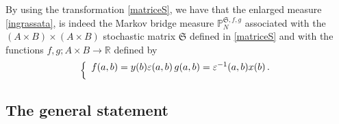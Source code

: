 \documentclass[reqno]{amsart}
\theoremstyle{plain}
\theoremstyle{definition}
\theoremstyle{remark}
\numberwithin{equation}{section}
\numberwithin{theorem}{section}
\def\\{\par\medskip}
\newcommand{\<}{\langle}
\renewcommand{\>}{\rangle}
\begin{document}
	By using the transformation \eqref{matriceS}, we have that the enlarged measure \eqref{ingrassata}, is indeed the Markov bridge measure $\mathbb P_N^{\mathfrak S,f,g}$ associated with the $(A\times B)\times (A\times B)$ stochastic matrix $\mathfrak S$ defined in \eqref{matriceS} and with the functions $f,g;A\times B\to \mathbb R$ defined by
	\begin{equation*}
		\left\{
		\begin{array}{l}
			f(a,b)=y(b)\varepsilon (a,b)\,\\
			g(a,b)=\varepsilon^{-1}(a,b)x(b)\,.
		\end{array}
		\right.
	\end{equation*}
	
	\subsection{The general statement}
	
\end{document}
